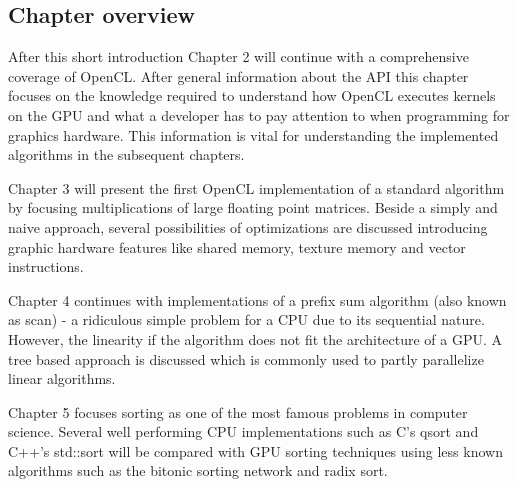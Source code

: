 \subsection{Chapter overview}

After this short introduction Chapter 2 will continue with a comprehensive coverage of OpenCL. After general information about the API this chapter focuses on the knowledge required to understand how OpenCL executes kernels on the GPU and what a developer has to pay attention to when programming for graphics hardware. This information is vital for understanding the implemented algorithms in the subsequent chapters.

Chapter 3 will present the first OpenCL implementation of a standard algorithm by focusing multiplications of large floating point matrices. Beside a simply and naive approach, several possibilities of optimizations are discussed introducing graphic hardware features like shared memory, texture memory and vector instructions.

\pagebreak

Chapter 4 continues with implementations of a prefix sum algorithm (also known as scan) - a ridiculous simple problem for a CPU due to its sequential nature. However, the linearity if the algorithm does not fit the architecture of a GPU. A tree based approach is discussed which is commonly used to partly parallelize linear algorithms.

Chapter 5 focuses sorting as one of the most famous problems in computer science. Several well performing CPU implementations such as C's qsort and C++'s std::sort will be compared with GPU sorting techniques using less known algorithms such as the bitonic sorting network and radix sort.
